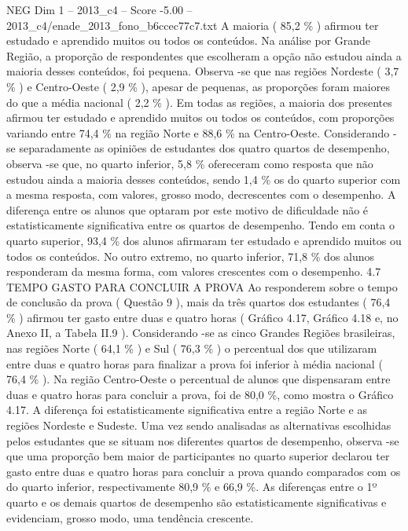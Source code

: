 \begin{textsample}{NEG Dim 1 – 2013\_c4 – Score -5.00 – 2013\_c4/enade\_2013\_fono\_b6ccec77c7.txt}
A maioria ( 85,2 \% ) afirmou ter estudado e aprendido muitos ou todos os conteúdos.
Na análise por Grande Região, a proporção de respondentes que escolheram a opção não estudou ainda a maioria desses conteúdos, foi pequena.
Observa -se que nas regiões Nordeste ( 3,7 \% ) e Centro-Oeste ( 2,9 \% ), apesar de pequenas, as proporções foram maiores do que a média nacional ( 2,2 \% ).
Em todas as regiões, a maioria dos presentes afirmou ter estudado e aprendido muitos ou todos os conteúdos, com proporções variando entre 74,4 \% na região Norte e 88,6 \% na Centro-Oeste.
Considerando -se separadamente as opiniões de estudantes dos quatro quartos de desempenho, observa -se que, no quarto inferior, 5,8 \% ofereceram como resposta que não estudou ainda a maioria desses conteúdos, sendo 1,4 \% os do quarto superior com a mesma resposta, com valores, grosso modo, decrescentes com o desempenho.
A diferença entre os alunos que optaram por este motivo de dificuldade não é estatisticamente significativa entre os quartos de desempenho.
Tendo em conta o quarto superior, 93,4 \% dos alunos afirmaram ter estudado e aprendido muitos ou todos os conteúdos.
No outro extremo, no quarto inferior, 71,8 \% dos alunos responderam da mesma forma, com valores crescentes com o desempenho. 4.7 TEMPO GASTO PARA CONCLUIR A PROVA Ao responderem sobre o tempo de conclusão da prova ( Questão 9 ), mais da três quartos dos estudantes ( 76,4 \% ) afirmou ter gasto entre duas e quatro horas ( Gráfico 4.17, Gráfico 4.18 e, no Anexo II, a Tabela II.9 ).
Considerando -se as cinco Grandes Regiões brasileiras, nas regiões Norte ( 64,1 \% ) e Sul ( 76,3 \% ) o percentual dos que utilizaram entre duas e quatro horas para finalizar a prova foi inferior à média nacional ( 76,4 \% ).
Na região Centro-Oeste o percentual de alunos que dispensaram entre duas e quatro horas para concluir a prova, foi de 80,0 \%, como mostra o Gráfico 4.17.
A diferença foi estatisticamente significativa entre a região Norte e as regiões Nordeste e Sudeste.
Uma vez sendo analisadas as alternativas escolhidas pelos estudantes que se situam nos diferentes quartos de desempenho, observa -se que uma proporção bem maior de participantes no quarto superior declarou ter gasto entre duas e quatro horas para concluir a prova quando comparados com os do quarto inferior, respectivamente 80,9 \% e 66,9 \%.
As diferenças entre o 1º quarto e os demais quartos de desempenho são estatisticamente significativas e evidenciam, grosso modo, uma tendência crescente.

\end{textsample}

